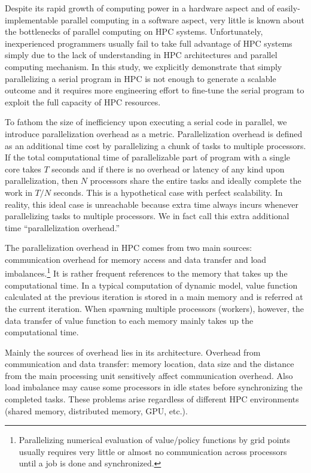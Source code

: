\documentclass[12pt]{article}
\begin{document}
Despite its rapid growth of computing power in a hardware aspect and of easily-implementable parallel computing in a software aspect, very little is known about the bottlenecks of parallel computing on HPC systems. Unfortunately, inexperienced programmers usually fail to take full advantage of HPC systems simply due to the lack of understanding in HPC architectures and parallel computing mechanism. In this study, we explicitly demonstrate that simply parallelizing a serial program in HPC is not enough to generate a scalable outcome and it requires more engineering effort to fine-tune the serial program to exploit the full capacity of HPC resources.

To fathom the size of inefficiency upon executing a serial code in parallel, we introduce parallelization overhead as a metric. Parallelization overhead is defined as an additional time cost by parallelizing a chunk of tasks to multiple processors. If the total computational time of parallelizable part of program with a single core takes $T$ seconds and if there is no overhead or latency of any kind upon parallelization, then $N$ processors share the entire tasks and ideally complete the work in $T/N$ seconds. This is a hypothetical case with perfect scalability. In reality, this ideal case is unreachable because extra time always incurs whenever parallelizing tasks to multiple processors. We in fact call this extra additional time ``parallelization overhead.''

The parallelization overhead in HPC comes from two main sources: communication overhead for memory access and data transfer and load imbalances.\footnote{\sf Parallelizing numerical evaluation of value/policy functions by grid points usually requires very little or almost no communication across processors until a job is done and synchronized.} It is rather frequent references to the memory that takes up the computational time. In a typical computation of dynamic model, value function calculated at the previous iteration is stored in a main memory and is referred at the current iteration. When spawning multiple processors (workers), however, the data transfer of value function to each memory mainly takes up the computational time.

Mainly the sources of overhead lies in its architecture. Overhead from communication and data transfer: memory location, data size and the distance from the main processing unit sensitively affect communication overhead. Also load imbalance may cause some processors in idle states before synchronizing the completed tasks.
These problems arise regardless of different HPC environments (shared memory, distributed memory, GPU, etc.).
\end{document}
